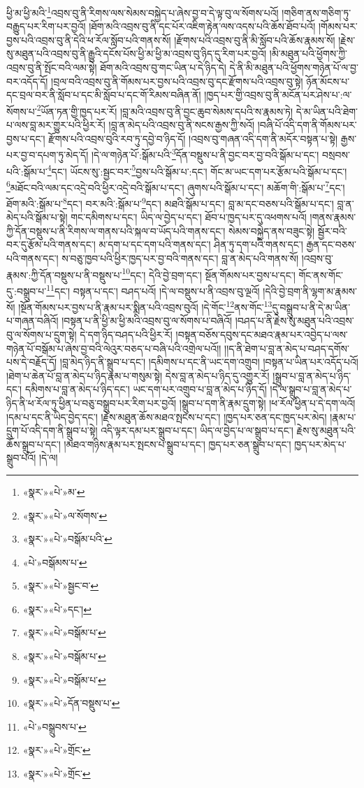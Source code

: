 ཕྱི་མ་ཕྱི་མའི་\footnote{«སྣར་»«པེ་»མ་}འབྲས་བུ་ནི་རིགས་ལས་སེམས་བསྐྱེད་པ་ཞེས་བྱ་བ་དེ་ལྟ་བུ་ལ་སོགས་པའོ། །གཅིག་ནས་གཅིག་ཏུ་བརྒྱུད་པར་རིག་པར་བྱའོ། །ཐོག་མའི་འབྲས་བུ་ནི་དང་པོར་འཇིག་རྟེན་ལས་འདས་པའི་ཆོས་ཐོབ་པའོ། །གོམས་པར་བྱས་པའི་འབྲས་བུ་ནི་དེའི་ཕ་རོལ་སློབ་པའི་གནས་སོ། །རྫོགས་པའི་འབྲས་བུ་ནི་མི་སློབ་པའི་ཆོས་རྣམས་སོ། །རྗེས་སུ་མཐུན་པའི་འབྲས་བུ་ནི་རྒྱུའི་དངོས་པོས་ཕྱི་མ་ཕྱི་མ་འབྲས་བུ་ཉིད་དུ་རིག་པར་བྱའོ། །མི་མཐུན་པའི་ཕྱོགས་ཀྱི་འབྲས་བུ་ནི་སྤོང་བའི་ལམ་སྟེ། ཐོག་མའི་འབྲས་བུ་གང་ཡིན་པ་དེ་ཉིད་དེ། དེ་ནི་མི་མཐུན་པའི་ཕྱོགས་གཉེན་པོ་ལ་བྱ་བར་འདོད་དོ། །བྲལ་བའི་འབྲས་བུ་ནི་གོམས་པར་བྱས་པའི་འབྲས་བུ་དང་རྫོགས་པའི་འབྲས་བུ་སྟེ། ཉོན་མོངས་པ་དང་བྲལ་བར་ནི་སློབ་པ་དང་མི་སློབ་པ་དང་གོ་རིམས་བཞིན་ནོ། །ཁྱད་པར་གྱི་འབྲས་བུ་ནི་མངོན་པར་ཤེས་པ་:ལ་སོགས་པ་\footnote{«སྣར་»«པེ་»ལ་སོགས་}ཡོན་ཏན་གྱི་ཁྱད་པར་རོ། །བླ་མའི་འབྲས་བུ་ནི་བྱང་ཆུབ་སེམས་དཔའི་ས་རྣམས་ཏེ། དེ་མ་ཡིན་པའི་ཐེག་པ་ལས་བླ་མར་གྱུར་པའི་ཕྱིར་རོ། །བླ་ན་མེད་པའི་འབྲས་བུ་ནི་སངས་རྒྱས་ཀྱི་སའོ། །བཞི་པོ་འདི་དག་ནི་གོམས་པར་བྱས་པ་དང་། རྫོགས་པའི་འབྲས་བུའི་རབ་ཏུ་དབྱེ་བ་ཉིད་དོ། །འབྲས་བུ་གཞན་འདི་དག་ནི་མདོར་བསྟན་པ་སྟེ། རྒྱས་པར་བྱ་བ་དཔག་ཏུ་མེད་དོ། །དེ་ལ་གཉེན་པོ་:སྒོམ་པའི་\footnote{«སྣར་»«པེ་»བསྒོམ་པའི་}དོན་བསྡུས་པ་ནི་བྱང་བར་བྱ་བའི་སྒོམ་པ་དང་། བསྲབས་པའི་:སྒོམ་པ་\footnote{«པེ་»བསྒོམས་པ་}དང་། ཡོངས་སུ་:སྦྱང་བར་\footnote{«སྣར་»«པེ་»སྦྱང་བ་}བྱས་པའི་སྒོམ་པ་:དང་། གོང་མ་ཡང་དག་པར་རྩོམ་པའི་སྒོམ་པ་དང་། \footnote{«སྣར་»«པེ་»དང་།  }མཐོང་བའི་ལམ་དང་འདྲེ་བའི་ཕྱིར་འདྲེ་བའི་སྒོམ་པ་དང་། ཞུགས་པའི་སྒོམ་པ་དང་། མཆོག་གི་:སྒོམ་པ་\footnote{«སྣར་»«པེ་»བསྒོམ་པ་}དང་། ཐོག་མའི་:སྒོམ་པ་\footnote{«སྣར་»«པེ་»བསྒོམ་པ་}དང་། བར་མའི་:སྒོམ་པ་\footnote{«སྣར་»«པེ་»བསྒོམ་པ་}དང་། མཐའི་སྒོམ་པ་དང་། བླ་མ་དང་བཅས་པའི་སྒོམ་པ་དང་། བླ་ན་མེད་པའི་སྒོམ་པ་སྟེ། གང་དམིགས་པ་དང་། ཡིད་ལ་བྱེད་པ་དང་། ཐོབ་པ་ཁྱད་པར་དུ་འཕགས་པའོ། །གནས་རྣམས་ཀྱི་དོན་བསྡུས་པ་ནི་རིགས་ལ་གནས་པའི་སྐལ་བ་ཡོད་པའི་གནས་དང་། སེམས་བསྐྱེད་ནས་བཟུང་སྟེ། སྦྱོར་བའི་བར་དུ་རྩོམ་པའི་གནས་དང་། མ་དག་པ་དང་དག་པའི་གནས་དང་། ཤིན་ཏུ་དག་པའི་གནས་དང་། རྒྱན་དང་བཅས་པའི་གནས་དང་། ས་བཅུ་ཁྱབ་པའི་ཕྱིར་ཁྱད་པར་བྱ་བའི་གནས་དང་། བླ་ན་མེད་པའི་གནས་སོ། །འབྲས་བུ་རྣམས་:ཀྱི་དོན་བསྡུས་པ་ནི་བསྡུས་པ་\footnote{«སྣར་»«པེ་»དོན་བསྡུས་པ་}དང་། དེའི་བྱེ་བྲག་དང་། སྔོན་གོམས་པར་བྱས་པ་དང་། གོང་ནས་གོང་དུ་:བསྒྲུབ་པ་\footnote{«པེ་»བསྒྲུབས་པ་}དང་། བསྟན་པ་དང་། བཤད་པའོ། །དེ་ལ་བསྡུས་པ་ནི་འབྲས་བུ་ལྔའོ། །དེའི་བྱེ་བྲག་ནི་ལྷག་མ་རྣམས་སོ། །སྔོན་གོམས་པར་བྱས་པ་ནི་རྣམ་པར་སྨིན་པའི་འབྲས་བུའོ། །དེ་གོང་\footnote{«སྣར་»«པེ་»གྲོང་}ནས་གོང་\footnote{«སྣར་»«པེ་»གྲོང་}དུ་བསྒྲུབ་པ་ནི་དེ་མ་ཡིན་པ་གཞན་བཞིའོ། །བསྟན་པ་ནི་ཕྱི་མ་ཕྱི་མའི་འབྲས་བུ་ལ་སོགས་པ་བཞིའོ། །བཤད་པ་ནི་རྗེས་སུ་མཐུན་པའི་འབྲས་བུ་ལ་སོགས་པ་དྲུག་སྟེ། དེ་དག་ཉིད་བཤད་པའི་ཕྱིར་རོ། །བསྟན་བཅོས་དབུས་དང་མཐའ་རྣམ་པར་འབྱེད་པ་ལས་གཉེན་པོ་བསྒོམ་པ་ཞེས་བྱ་བའི་ལེའུར་བཅད་པ་བཞི་པའི་འགྲེལ་པའོ།། །།ད་ནི་ཐེག་པ་བླ་ན་མེད་པ་བཤད་དགོས་པས་དེ་བརྗོད་དོ། །བླ་མེད་ཉིད་ནི་སྒྲུབ་པ་དང་། །དམིགས་པ་དང་ནི་ཡང་དག་འགྲུབ། །བསྟན་པ་ཡིན་པར་འདོད་པའོ། །ཐེག་པ་ཆེན་པོ་བླ་ན་མེད་པ་ཉིད་རྣམ་པ་གསུམ་སྟེ། དེས་བླ་ན་མེད་པ་ཉིད་དུ་འགྱུར་རོ། །སྒྲུབ་པ་བླ་ན་མེད་པ་ཉིད་དང་། དམིགས་པ་བླ་ན་མེད་པ་ཉིད་དང་། ཡང་དག་པར་འགྲུབ་པ་བླ་ན་མེད་པ་ཉིད་དོ། །དེ་ལ་སྒྲུབ་པ་བླ་ན་མེད་པ་ཉིད་ནི་ཕ་རོལ་ཏུ་ཕྱིན་པ་བཅུ་བསྒྲུབ་པར་རིག་པར་བྱའོ། །སྒྲུབ་པ་དག་ནི་རྣམ་དྲུག་སྟེ། །ཕ་རོལ་ཕྱིན་པ་དེ་དག་ལའོ། །དམ་པ་དང་ནི་ཡིད་བྱེད་དང་། །རྗེས་མཐུན་ཆོས་མཐའ་སྤངས་པ་དང་། །ཁྱད་པར་ཅན་དང་ཁྱད་པར་མེད། །རྣམ་པ་དྲུག་པོ་འདི་དག་ནི་སྒྲུབ་པ་སྟེ། འདི་ལྟར་དམ་པར་སྒྲུབ་པ་དང་། ཡིད་ལ་བྱེད་པ་ལ་སྒྲུབ་པ་དང་། རྗེས་སུ་མཐུན་པའི་ཆོས་སྒྲུབ་པ་དང་། །མཐའ་གཉིས་རྣམ་པར་སྤངས་པ་སྒྲུབ་པ་དང་། ཁྱད་པར་ཅན་སྒྲུབ་པ་དང་། ཁྱད་པར་མེད་པ་སྒྲུབ་པའོ། །དེ་ལ། 